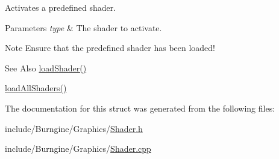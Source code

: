 Activates a predefined shader. 


\begin{DoxyParams}{Parameters}
{\em type} & The shader to activate.\\
\hline
\end{DoxyParams}
\begin{DoxyNote}{Note}
Ensure that the predefined shader has been loaded!
\end{DoxyNote}
\begin{DoxySeeAlso}{See Also}
\hyperlink{structburn_1_1_burngine_shaders_ab9ebed7c4668a72e7cbbd0630226d7ab}{load\-Shader()} 

\hyperlink{structburn_1_1_burngine_shaders_a33e19e46e7bc1b6d18f05d2ee233dc50}{load\-All\-Shaders()} 
\end{DoxySeeAlso}


The documentation for this struct was generated from the following files\-:\begin{DoxyCompactItemize}
\item 
include/\-Burngine/\-Graphics/\hyperlink{_shader_8h}{Shader.\-h}\item 
include/\-Burngine/\-Graphics/\hyperlink{_shader_8cpp}{Shader.\-cpp}\end{DoxyCompactItemize}
